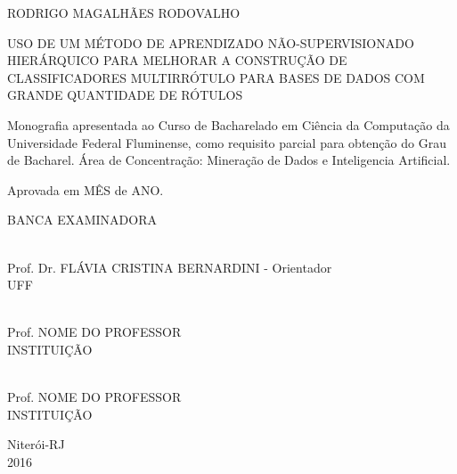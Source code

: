 
\begin{center}

RODRIGO MAGALHÃES RODOVALHO

\vspace{1.0cm}

USO DE UM MÉTODO DE APRENDIZADO NÃO-SUPERVISIONADO HIERÁRQUICO PARA MELHORAR A CONSTRUÇÃO
DE CLASSIFICADORES MULTIRRÓTULO PARA BASES DE DADOS COM GRANDE QUANTIDADE DE RÓTULOS

\vspace{1.0cm}

\begin{flushright}
\begin{minipage}{0.45\textwidth}

Monografia apresentada ao Curso de \linebreak Bacharelado em Ciência da Computação da \linebreak Universidade Federal Fluminense, como \linebreak requisito parcial para obtenção do Grau de Bacharel. Área de Concentração: Mineração de Dados e  Inteligencia Artificial.

\end{minipage}
\end{flushright}

\vfill

\begin{flushleft}

Aprovada em MÊS de ANO.

\end{flushleft}

\vfill

BANCA EXAMINADORA

\vfill

\hrulefill \\Prof. Dr. FLÁVIA CRISTINA BERNARDINI - Orientador\\UFF\\

\vfill

\hrulefill \\Prof. NOME DO PROFESSOR\\INSTITUIÇÃO\\

\vfill

\hrulefill \\Prof. NOME DO PROFESSOR\\INSTITUIÇÃO\\

\vfill


Niterói-RJ\\2016

\end{center}

\newpage
